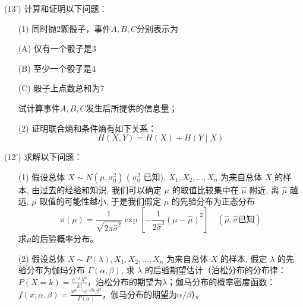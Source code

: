 \documentclass[12pt,a4paper,openany,twoside]{ctexbook}
\begin{document}
\begin{exercise}(13')
	计算和证明以下问题：
	\begin{itemize}
		\item [(1)] 同时抛2颗骰子，事件$A,B,C$分别表示为
		
		(A) 仅有一个骰子是3
		
		(B) 至少一个骰子是4
		
		(C) 骰子上点数总和为7
		
		试计算事件$A,B,C$发生后所提供的信息量；
		
		\item [(2)] 证明联合熵和条件熵有如下关系：
		$$H(X,Y) = H(X) + H(Y\mid X)$$
		
	\end{itemize}
\end{exercise}

\begin{exercise}(12')
	求解以下问题：
\begin{itemize}
	\item [(1)] 假设总体 $X \sim N\left(\mu, \sigma_0^{2}\right)$ ( $\sigma_0^{2}$ 已知), $X_{1}, X_{2}, \ldots, X_{n}$ 为来自总体 $X$ 的样 本, 由过去的经验和知识, 我们可以确定 $\mu$ 的取值比较集中在 $\hat{\mu}$ 附近, 离 $\hat{\mu}$ 越远, $\mu$ 取值的可能性越小, 于是我们假定 $\mu$ 的先验分布为正态分布
	$$
	\pi(\mu)=\frac{1}{\sqrt{2 \pi \hat{\sigma}^{2}}} \exp \left[-\frac{1}{2 \hat{\sigma}^{2}}\left(\mu-\hat{\mu}\right)^{2}\right] \quad (\hat{\mu}, \hat{\sigma} \text{已知})
	$$
	求$\mu$的后验概率分布。
	\item [(2)] 假设总体 $X \sim P(\lambda), X_{1}, X_{2}, \ldots, X_{n}$ 为来自总体 $X$ 的样本, 假定 $\lambda$ 的先 验分布为伽玛分布 $\Gamma(\alpha, \beta)$, 求 $\lambda$ 的后验期望估计（泊松分布的分布律：$P(X=k) = \frac{e^{-\lambda} \lambda^k}{k!}$，泊松分布的期望为$\lambda$；伽马分布的概率密度函数：$f(x ; \alpha, \beta)=\frac{x^{\alpha-1} e^{-\beta x} \beta^{\alpha}}{\Gamma(\alpha)}$，伽马分布的期望为$\alpha/\beta$）。
\end{itemize}

\end{exercise}
\end{document}
